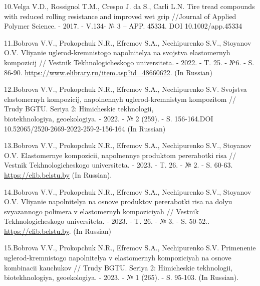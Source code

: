 \begin{references}
10.Velga V.D., Rossignol T.M., Crespo J. da S., Carli L.N. Tire tread
compounds with reduced rolling resistance and improved wet grip
//Journal of Applied Polymer Science. - 2017. - V.134- № 3 -- APP.
45334. DOI 10.1002/app.45334

11.Bobrova V.V., Prokopchuk N.R., Efremov S.A., Nechipurenko S.V.,
Stoyanov O.V. Vliyanie uglerod-kremnistogo napolnitelya na svojstva
elastomernyh kompozicij // Vestnik Tekhnologicheskogo universiteta. -
2022. - T. 25. - №6. - S. 86-90.
\url{https://www.elibrary.ru/item.asp?id=48660622}. (In Russian)

12.Bobrova V.V., Prokopchuk N.R., Efremov S.A., Nechipurenko S.V.
Svojstva elastomernyh kompozicij, napolnennyh uglerod-kremnistym
kompozitom // Trudy BGTU. Seriya 2: Himicheskie tekhnologii,
\\biotekhnologiya, geoekologiya. - 2022. - № 2 (259). - S. 156-164.DOI
10.52065/2520-2669-2022-259-2-156-164 (In Russian)

13.Bobrova V.V., Prokopchuk N.R., Efremov S.A., Nechipurenko S.V.,
Stoyanov O.V. Elastomernye kompozicii, napolnennye produktom pererabotki
risa // Vestnik Tekhnologicheskogo universiteta. - 2023. - T. 26. - № 2.
- S. 60-63. \href{https://elib.belstu.by/handle/123456789/65005/}{https://elib.belstu.by} (In Russian).

14.Bobrova V.V., Prokopchuk N.R., Efremov S.A., Nechipurenko S.V.,
Stoyanov O.V. Vliyanie napolnitelya na osnove produktov pererabotki risa
na dolyu svyazannogo polimera v elastomernyh kompoziciyah // Vestnik
Tekhnologicheskogo universiteta. - 2023. - T. 26. - № 3. - S.
50-52.. \href{https://elib.belstu.by/handle/123456789/65006}{https://elib.belstu.by}. (In Russian)

15.Bobrova V.V., Prokopchuk N.R., Efremov S.A., Nechipurenko S.V.
Primenenie uglerod-kremnistogo napolnitelya v elastomernyh kompoziciyah
na osnove kombinacii kauchukov // Trudy BGTU. Seriya 2: Himicheskie
tekhnologii, biotekhnologiya, geoekologiya. - 2023. - № 1 (265). - S.
95-103. (In Russian).
\end{references}

